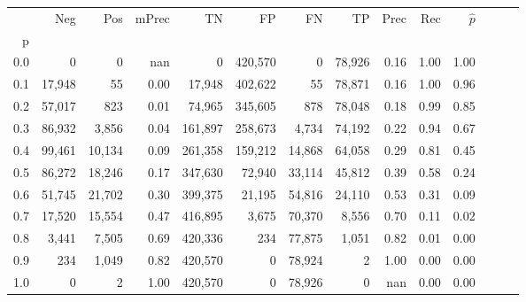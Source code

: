 \begin{tabular}{rrrrrrrrrrrrrr}
\toprule
{} &     Neg &     Pos & mPrec &       TN &       FP &      FN &      TP &  Prec &   Rec & $\hat{p}$ \\
p   &         &         &       &          &          &         &         &       &       &           \\
\midrule
0.0 &       0 &       0 &   nan &        0 &  420,570 &       0 &  78,926 &  0.16 &  1.00 &      1.00 \\
0.1 &  17,948 &      55 &  0.00 &   17,948 &  402,622 &      55 &  78,871 &  0.16 &  1.00 &      0.96 \\
0.2 &  57,017 &     823 &  0.01 &   74,965 &  345,605 &     878 &  78,048 &  0.18 &  0.99 &      0.85 \\
0.3 &  86,932 &   3,856 &  0.04 &  161,897 &  258,673 &   4,734 &  74,192 &  0.22 &  0.94 &      0.67 \\
0.4 &  99,461 &  10,134 &  0.09 &  261,358 &  159,212 &  14,868 &  64,058 &  0.29 &  0.81 &      0.45 \\
0.5 &  86,272 &  18,246 &  0.17 &  347,630 &   72,940 &  33,114 &  45,812 &  0.39 &  0.58 &      0.24 \\
0.6 &  51,745 &  21,702 &  0.30 &  399,375 &   21,195 &  54,816 &  24,110 &  0.53 &  0.31 &      0.09 \\
0.7 &  17,520 &  15,554 &  0.47 &  416,895 &    3,675 &  70,370 &   8,556 &  0.70 &  0.11 &      0.02 \\
0.8 &   3,441 &   7,505 &  0.69 &  420,336 &      234 &  77,875 &   1,051 &  0.82 &  0.01 &      0.00 \\
0.9 &     234 &   1,049 &  0.82 &  420,570 &        0 &  78,924 &       2 &  1.00 &  0.00 &      0.00 \\
1.0 &       0 &       2 &  1.00 &  420,570 &        0 &  78,926 &       0 &   nan &  0.00 &      0.00 \\
\bottomrule
\end{tabular}
